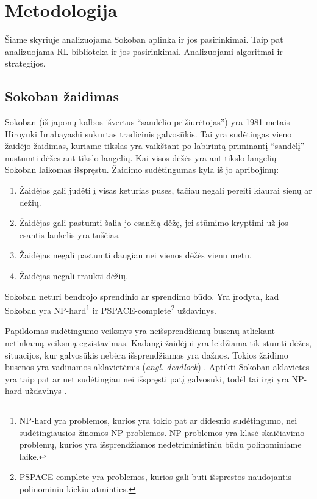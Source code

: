 \documentclass{VUMIFPSbakalaurinis}
\begin{document}
\section{Metodologija}
{
	Šiame skyriuje analizuojama Sokoban aplinka ir jos pasirinkimai. Taip pat analizuojama RL biblioteka ir jos pasirinkimai. Analizuojami algoritmai ir strategijos.
}
\subsection{Sokoban žaidimas}
{
	Sokoban (iš japonų kalbos išvertus \enquote{sandėlio prižiūrėtojas}) yra 1981 metais Hiroyuki Imabayashi sukurtas tradicinis galvosūkis. Tai yra sudėtingas vieno žaidėjo žaidimas, kuriame tikslas yra vaikštant po labirintą priminantį \enquote{sandėlį} nustumti dėžes ant tikslo langelių. Kai visos dėžės yra ant tikslo langelių -- Sokoban laikomas išspręstu. Žaidimo sudėtingumas kyla iš jo apribojimų:
	\begin{enumerate}
		\item Žaidėjas gali judėti į visas keturias puses, tačiau negali pereiti kiaurai sienų ar dežių.
		\item Žaidėjas gali pastumti šalia jo esančią dėžę, jei stūmimo kryptimi už jos esantis laukelis yra tuščias.
		\item Žaidėjas negali pastumti daugiau nei vienos dėžės vienu metu.
		\item Žaidėjas negali traukti dėžių. 
	\end{enumerate}\par
	Sokoban neturi bendrojo sprendinio ar sprendimo būdo. Yra įrodyta, kad Sokoban yra NP-hard\footnote{NP-hard yra problemos, kurios yra tokio pat ar didesnio sudėtingumo, nei sudėtingiausios žinomos NP problemos. NP problemos yra klasė skaičiavimo problemų, kurios yra išsprendžiamos nedetriministiniu būdu polinominiame laike.} \cite{dor1999sokoban} ir PSPACE-complete\footnote{PSPACE-complete yra problemos, kurios gali būti išsprestos naudojantis polinominiu kiekiu atminties.} \cite{culberson1997sokoban} uždavinys.\par
	Papildomas sudėtingumo veiksnys yra neišsprendžiamų būsenų atliekant netinkamą veiksmą egzistavimas. Kadangi žaidėjui yra leidžiama tik stumti dėžes, situacijos, kur galvosūkis nebėra išsprendžiamas yra dažnos. Tokios žaidimo būsenos yra vadinamos aklavietėmis (\textit{angl. deadlock}) \cite{junghanns1998sokoban}. Aptikti Sokoban aklavietes yra taip pat ar net sudėtingiau nei išspręsti patį galvosūki, todėl tai irgi yra NP-hard uždavinys \cite{schaul2005evolving}.
}
\end{document}
